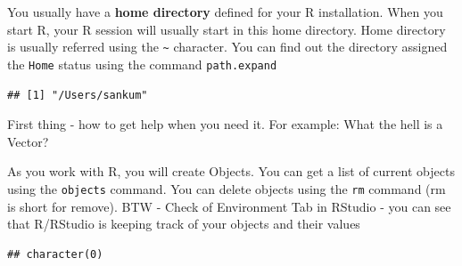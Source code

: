 \documentclass[11pt, letterpaper, twoside]{memoir}\usepackage{knitr}
\begin{document}
You usually have a \textbf{home directory} defined for your R installation. When you start R, your R session will usually start in this home directory. Home directory is usually referred using the \verb|~| character. You can find out the directory assigned the \texttt{Home} status using the command \texttt{path.expand}
\begin{knitrout}
\color{fgcolor}\begin{kframe}
\begin{alltt}
\hlstd{(}\hlstd{)}
\end{alltt}
\begin{verbatim}
## [1] "/Users/sankum"
\end{verbatim}
\end{kframe}
\end{knitrout}

First thing - how to get help when you need it. For example: What the hell is a Vector?
\begin{knitrout}
\color{fgcolor}\begin{kframe}
\begin{alltt}
\hlstd{(}\hlstd{)}  
\hlstd{(}  
\hlstd{)}
\hlstd{(}\hlstd{)}  
\end{alltt}
\end{kframe}
\end{knitrout}

As you work with R, you will create Objects. You can get a list of current objects using the \texttt{objects} command. You can delete objects using the \texttt{rm} command (rm is short for remove). BTW - Check of Environment Tab in RStudio - you can see that R/RStudio is keeping track of your objects and their values

\begin{knitrout}
\color{fgcolor}\begin{kframe}
\begin{alltt}
\hlstd{()}
\end{alltt}
\begin{verbatim}
## character(0)
\end{verbatim}
\begin{alltt}
\hlstd{(} \hlstd{=} \hlstd{())}  
\end{alltt}
\end{kframe}
\end{knitrout}
\end{document}
